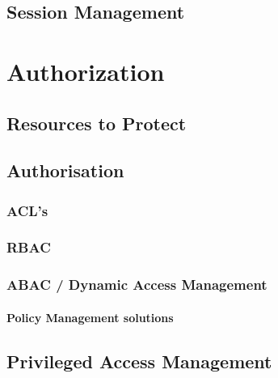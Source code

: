 \hypertarget{session-management}{%
\subsection{Session Management}\label{session-management}}

\hypertarget{authorization}{%
\section{Authorization}\label{authorization}}

\hypertarget{resources-to-protect}{%
\subsection{Resources to Protect}\label{resources-to-protect}}

\hypertarget{authorisation}{%
\subsection{Authorisation}\label{authorisation}}

\hypertarget{acls}{%
\subsubsection{ACL's}\label{acls}}

\hypertarget{rbac}{%
\subsubsection{RBAC}\label{rbac}}

\hypertarget{abac-dynamic-access-management}{%
\subsubsection{ABAC / Dynamic Access
Management}\label{abac-dynamic-access-management}}

\hypertarget{policy-management-solutions}{%
\paragraph{Policy Management
solutions}\label{policy-management-solutions}}

\hypertarget{privileged-access-management}{%
\subsection{Privileged Access
Management}\label{privileged-access-management}}

